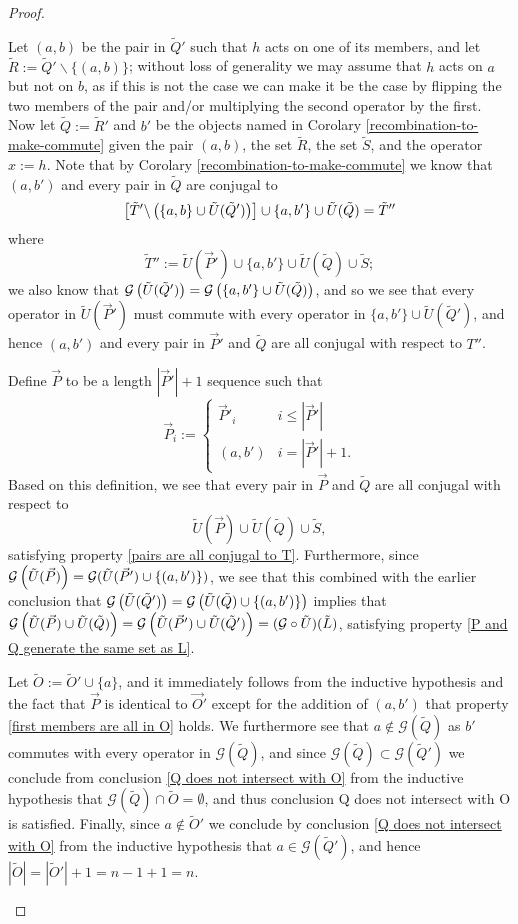 \documentclass[twocolumn,showpacs,preprintnumbers,amsmath,amssymb,nofootinbib,pra,floatfix]{revtex4-1}
\newcommand{\lst}{\vec}
\newcommand{\set}{\tilde}
\newcommand{\genfun}{\mathcal{G}}
\begin{document}
\begin{proof}
\begin{description}
Let $(a,b)$ be the pair in $\set Q'$ such that $h$ acts on one of its members, and let $\set R:=\set Q'\backslash\{(a,b)\}$;  without loss of generality we may assume that $h$ acts on $a$ but not on $b$, as if this is not the case we can make it be the case by flipping the two members of the pair and/or multiplying the second operator by the first.  Now let $\set Q:=\set R'$ and $b'$ be the objects named in Corolary \ref{recombination-to-make-commute} given the pair $(a,b)$, the set $\set R$, the set $\set S$, and the operator $x:=h$.  Note that by Corolary \ref{recombination-to-make-commute} we know that $(a,b')$ and every pair in $\set Q$ are conjugal to
$$\left[\set T'\backslash\paren{\{a,b\} \cup \set U(\set Q')}\right]\cup \{a,b'\} \cup \set U(\set Q)=\set T''$$
where
$$\set T'':=\set U(\lst P')\cup \{a,b'\} \cup \set U(\set Q)\cup \set S;$$
we also know that $\genfun\paren{\set U(\set Q')}=\genfun\paren{\{a,b'\}\cup \set U(\set Q)}$, and so we see that every operator in $\set U(\lst P')$ must commute with every operator in $\{a,b'\}\cup \set U(\set Q')$, and hence $(a,b')$ and every pair in $\lst P'$ and $\set Q$ are all conjugal with respect to $T''$.

Define $\lst P$ to be a length $|\lst P'|+1$ sequence such that
$$
\lst P_i :=
\begin{cases}
\lst P'_i & i \le |\lst P'| \\
(a,b') & i = |\lst P'|+1.
\end{cases}
$$
Based on this definition, we see that every pair in $\lst P$ and $\set Q$ are all conjugal with respect to $$\set U(\lst P) \cup \set U(\set Q)\cup \set S,$$ satisfying property \ref{pairs are all conjugal to T}.  Furthermore, since  $\genfun\paren{\set U(\lst P)} = \genfun(\set U(\lst P')\cup\{(a,b')\})$, we see that this combined with the earlier conclusion that $\genfun\paren{\set U(\set Q')}=\genfun\paren{\set U(\set Q)\cup\{(a,b')\}}$ implies that $\genfun\paren{\set U(\lst P)\cup \set U(\set Q)}=\genfun\paren{\set U(\lst P')\cup \set U(\set Q')}=(\genfun\circ\set U)(\set L)$, satisfying property \ref{P and Q generate the same set as L}.

Let $\set O := \set O'\cup\{a\}$, and it immediately follows from the inductive hypothesis and the fact that $\lst P$ is identical to $\lst O'$ except for the addition of $(a,b')$ that property \ref{first members are all in O} holds.  We furthermore see that $a\notin \genfun(\set Q)$ as $b'$ commutes with every operator in $\genfun(\set Q)$, and since $\genfun(\set Q)\subset\genfun(\set Q')$ we conclude from conclusion \ref{Q does not intersect with O} from the inductive hypothesis that $\genfun(\set Q)\cap\set O=\emptyset$, and thus conclusion {Q does not intersect with O} is satisfied.  Finally, since $a\notin \set O'$ we conclude by conclusion \ref{Q does not intersect with O} from the inductive hypothesis that $a\in\genfun(\set Q')$, and hence $|\set O|=|\set O'|+1=n-1+1=n$.


\end{description}
\end{proof}
\end{document}
